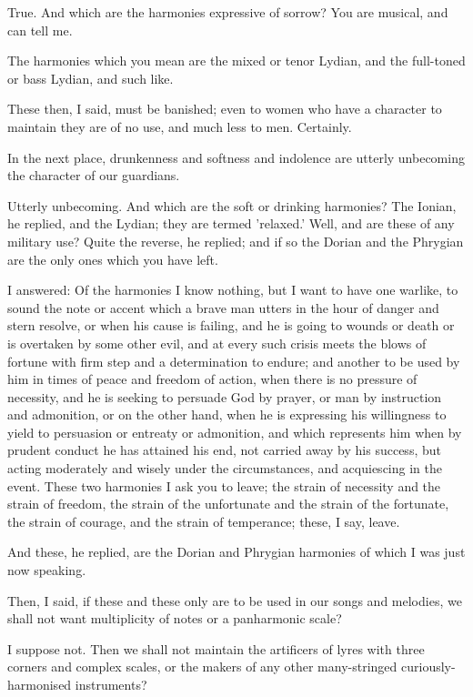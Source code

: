 True.
And which are the harmonies expressive of sorrow? You are musical, and can tell me.

The harmonies which you mean are the mixed or tenor Lydian, and the full-toned or bass Lydian, and such like.

These then, I said, must be banished; even to women who have a character to maintain they are of no use, and much less to men. Certainly.

In the next place, drunkenness and softness and indolence are utterly unbecoming the character of our guardians.

Utterly unbecoming.
And which are the soft or drinking harmonies?
The Ionian, he replied, and the Lydian; they are termed 'relaxed.'
Well, and are these of any military use?
Quite the reverse, he replied; and if so the Dorian and the Phrygian are the only ones which you have left.

I answered: Of the harmonies I know nothing, but I want to have one warlike, to sound the note or accent which a brave man utters in the hour of danger and stern resolve, or when his cause is failing, and he is going to wounds or death or is overtaken by some other evil, and at every such crisis meets the blows of fortune with firm step and a determination to endure; and another to be used by him in times of peace and freedom of action, when there is no pressure of necessity, and he is seeking to persuade God by prayer, or man by instruction and admonition, or on the other hand, when he is expressing his willingness to yield to persuasion or entreaty or admonition, and which represents him when by prudent conduct he has attained his end, not carried away by his success, but acting moderately and wisely under the circumstances, and acquiescing in the event. These two harmonies I ask you to leave; the strain of necessity and the strain of freedom, the strain of the unfortunate and the strain of the fortunate, the strain of courage, and the strain of temperance; these, I say, leave.

And these, he replied, are the Dorian and Phrygian harmonies of which I was just now speaking.

Then, I said, if these and these only are to be used in our songs and melodies, we shall not want multiplicity of notes or a panharmonic scale?

I suppose not.
Then we shall not maintain the artificers of lyres with three corners and complex scales, or the makers of any other many-stringed curiously-harmonised instruments?

